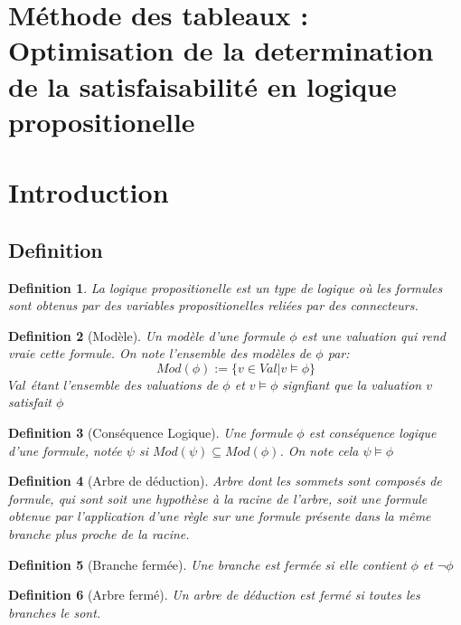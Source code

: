 \documentclass{paper}
\newtheorem{defi}{Definition}
\begin{document}
\setlength{\headheight}{13.07225pt}
\addtolength{\topmargin}{-1.07225pt}

\section*{Méthode des tableaux : Optimisation de la determination de la satisfaisabilité en logique propositionelle}

\tableofcontents

\section{Introduction}

\subsection{Definition}



\begin{defi}
La \textit{logique propositionelle} est un type de logique où les formules sont obtenus par des variables propositionelles reliées par des connecteurs.
\end{defi}
\begin{defi}[Modèle]
    Un \textit{modèle} d'une formule $\phi$ est une valuation qui rend vraie cette formule. On note l'ensemble des modèles de $\phi$ par:
    $$Mod(\phi) := \{v\in Val | v \vDash \phi\}$$
    $Val$ étant l'ensemble des valuations de $\phi$ et $v \vDash \phi$ signfiant que la valuation $v$ satisfait $\phi$
\end{defi}
\begin{defi}[Conséquence Logique]
    Une formule $\phi$ est \textit{conséquence logique} d'une formule, notée $\psi$ si $Mod(\psi) \subseteq Mod(\phi)$. On note cela $\psi \vDash \phi$
\end{defi}

\begin{defi}[Arbre de déduction]
    Arbre dont les sommets sont composés de formule, qui sont soit une hypothèse à la racine de l'arbre, soit une formule obtenue par l'application d'une règle sur une formule présente dans la même branche plus proche de la racine.
\end{defi}

\begin{defi}[Branche fermée]
    Une branche est fermée si elle contient $\phi$ et $\lnot\phi$
\end{defi}

\begin{defi}[Arbre fermé]
    Un arbre de déduction est fermé si toutes les branches le sont.
\end{defi}
\end{document}
